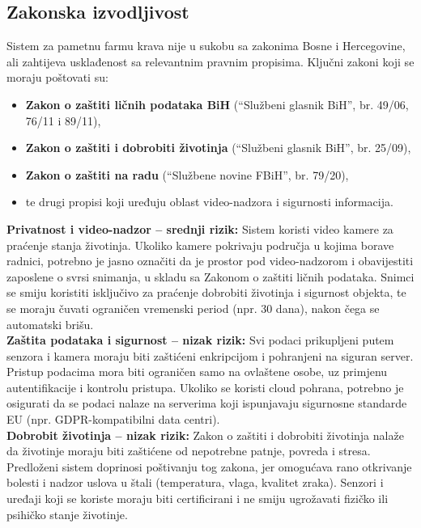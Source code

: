 \documentclass{article}
\begin{document}
\subsection{Zakonska izvodljivost}

Sistem za pametnu farmu krava nije u sukobu sa zakonima Bosne i Hercegovine, ali zahtijeva usklađenost sa relevantnim pravnim propisima. Ključni zakoni koji se moraju poštovati su:
\begin{itemize}
    \item \textbf{Zakon o zaštiti ličnih podataka BiH} (``Službeni glasnik BiH'', br. 49/06, 76/11 i 89/11),
    \item \textbf{Zakon o zaštiti i dobrobiti životinja} (``Službeni glasnik BiH'', br. 25/09),
    \item \textbf{Zakon o zaštiti na radu} (``Službene novine FBiH'', br. 79/20),
    \item te drugi propisi koji uređuju oblast video-nadzora i sigurnosti informacija.
\end{itemize}

\noindent
\textbf{Privatnost i video-nadzor – srednji rizik:}  
Sistem koristi video kamere za praćenje stanja životinja. Ukoliko kamere pokrivaju područja u kojima borave radnici, potrebno je jasno označiti da je prostor pod video-nadzorom i obavijestiti zaposlene o svrsi snimanja, u skladu sa Zakonom o zaštiti ličnih podataka. Snimci se smiju koristiti isključivo za praćenje dobrobiti životinja i sigurnost objekta, te se moraju čuvati ograničen vremenski period (npr. 30 dana), nakon čega se automatski brišu.\\

\noindent
\textbf{Zaštita podataka i sigurnost – nizak rizik:}  
Svi podaci prikupljeni putem senzora i kamera moraju biti zaštićeni enkripcijom i pohranjeni na siguran server. Pristup podacima mora biti ograničen samo na ovlaštene osobe, uz primjenu autentifikacije i kontrolu pristupa. Ukoliko se koristi cloud pohrana, potrebno je osigurati da se podaci nalaze na serverima koji ispunjavaju sigurnosne standarde EU (npr. GDPR-kompatibilni data centri).\\

\noindent
\textbf{Dobrobit životinja – nizak rizik:}  
Zakon o zaštiti i dobrobiti životinja nalaže da životinje moraju biti zaštićene od nepotrebne patnje, povreda i stresa. Predloženi sistem doprinosi poštivanju tog zakona, jer omogućava rano otkrivanje bolesti i nadzor uslova u štali (temperatura, vlaga, kvalitet zraka). Senzori i uređaji koji se koriste moraju biti certificirani i ne smiju ugrožavati fizičko ili psihičko stanje životinje.\\
\end{document}
